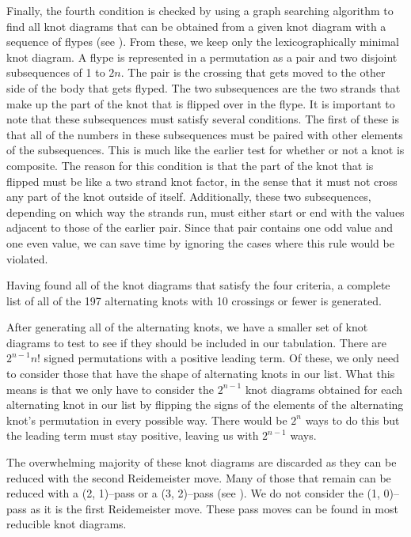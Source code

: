 \begin{paper}

Finally, the fourth condition is checked by using a graph searching algorithm to
find all knot diagrams that can be obtained from a given knot diagram with a
sequence of flypes (see \figMoves).
From these, we keep only the lexicographically minimal knot diagram.
A flype is represented in a permutation as a pair and two disjoint subsequences
of 1 to $2n$.
The pair is the crossing that gets moved to the other side of the body that gets
flyped.
The two subsequences are the two strands that make up the part of the knot that
is flipped over in the flype.
It is important to note that these subsequences must satisfy several conditions.
The first of these is that all of the numbers in these subsequences must be
paired with other elements of the subsequences.
This is much like the earlier test for whether or not a knot is composite.
The reason for this condition is that the part of the knot that is flipped must
be like a two strand knot factor, in the sense that it must not cross any part
of the knot outside of itself.
Additionally, these two subsequences, depending on which way the strands run,
must either start or end with the values adjacent to those of the earlier pair.
Since that pair contains one odd value and one even value, we can save time by
ignoring the cases where this rule would be violated.


Having found all of the knot diagrams that satisfy the four criteria, a complete
list of all of the 197 alternating knots with 10 crossings or fewer is generated.



After generating all of the alternating knots, we have a smaller set of knot
diagrams to test to see if they should be included in our tabulation.
There are $2^{n-1}n!$ signed permutations with a positive leading term.
Of these, we only need to consider those that have the shape of alternating
knots in our list.
What this means is that we only have to consider the $2^{n-1}$ knot diagrams
obtained for each alternating knot in our list by flipping the signs of the
elements of the alternating knot's permutation in every possible way.
There would be $2^n$ ways to do this but the leading term must stay positive,
leaving us with $2^{n-1}$ ways.

The overwhelming majority of these knot diagrams are discarded as they can be
reduced with the second Reidemeister move.
Many of those that remain can be reduced with a (2, 1)--pass or a (3, 2)--pass
(see \figMoves).
We do not consider the (1, 0)--pass as it is the first Reidemeister move.
These pass moves can be found in most reducible knot diagrams.


\end{paper}
